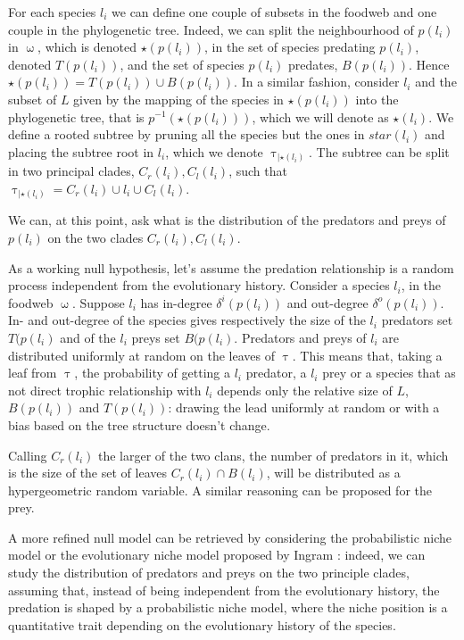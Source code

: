 \documentclass[12pt,a4paper]{report}
\begin{document}
For each species $l_i$ we can define one couple of subsets in the foodweb and one couple in the phylogenetic tree. Indeed, we can split the neighbourhood of $p(l_i)$ in $\upomega$, which is denoted $\star(p(l_i))$, in the set of species predating $p(l_i)$, denoted $T(p(l_i))$, and the set of species $p(l_i)$ predates, $B(p(l_i))$. Hence $\star(p(l_i))= T(p(l_i)) \cup B(p(l_i))$. In a similar fashion, consider $l_i$ and the subset of $L$ given by the mapping of the species in $\star(p(l_i))$ into the phylogenetic tree, that is $p^{-1}(\star(p(l_i)))$, which we will denote as $\star(l_i)$. We define a rooted subtree by pruning all the species but the ones in $star(l_i)$ and placing the subtree root in $l_i$, which we denote  $\uptau_{|\star(l_i)}$. The subtree can be split in two principal clades, $C_r(l_i), C_l(l_i)$, such that $\uptau_{|\star(l_i)} = C_r(l_i) \cup l_i \cup C_l(l_i)$.

We can, at this point, ask what is the distribution of the predators and preys of $p(l_i)$ on the two clades $C_r(l_i), C_l(l_i)$.

As a working null hypothesis, let's assume the predation relationship is a random process independent from the evolutionary history. Consider a species $l_i$, in the foodweb $\upomega$. Suppose $l_i$ has in-degree $\delta^i(p(l_i))$ and out-degree $\delta^o(p(l_i))$. In- and out-degree of the species gives respectively the size of the $l_i$ predators set $T(p(l_i)$ and of the $l_i$ preys set $B(p(l_i)$. Predators and preys of $l_i$ are distributed uniformly at random on the leaves of $\uptau$. This means that, taking a leaf from $\uptau$, the probability of getting a $l_i$ predator, a $l_i$ prey or a species that as not direct trophic relationship with $l_i$ depends only the relative size of $L$, $B(p(l_i))$ and $T(p(l_i))$: drawing the lead uniformly at random or with a bias based on the tree structure doesn't change.

Calling $C_r(l_i)$ the larger of the two clans, the number of predators in it, which is the size of the set of leaves $C_r(l_i) \cap B(l_i)$,  will be distributed as a hypergeometric random variable. A similar reasoning can be proposed for the prey.

A more refined null model can be retrieved by considering the probabilistic niche model \cite{williams2010probabilistic} or the evolutionary niche model proposed by Ingram \cite{ingram2012should}: indeed, we can study the distribution of predators and preys on the two principle clades, assuming that, instead of being independent from the evolutionary history, the predation is shaped by a probabilistic niche model, where the niche position is a quantitative trait depending on the evolutionary history of the species.
\end{document}
